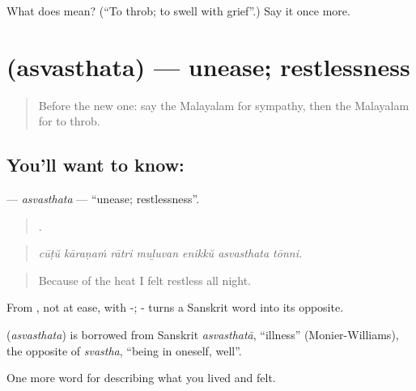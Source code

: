 \begin{tcolorbox}[breakable,colback=teal!4,colframe=teal!35!black,title={Before you move on}]
What does  mean? (\textquotedblleft{}To throb; to swell with grief\textquotedblright{}.) Say it once more.
\end{tcolorbox}
\section[\texorpdfstring{\ml{അസ്വസ്ഥത} (asvasthata)}{അസ്വസ്ഥത (asvasthata)}]{ (asvasthata) — unease; restlessness}

\label{lesson:ML-C520-asvasthata}



\begin{quote}
Before the new one: say the Malayalam for sympathy, then the Malayalam for to throb.
\end{quote}

\subsection*{You'll want to know: }
\textbf{} — \emph{asvasthata} — \textquotedblleft{}unease; restlessness\textquotedblright{}.

\begin{quote}
      .
\end{quote}

\begin{quote}
\emph{cūṭŭ kāraṇaṁ rātri muḻuvan enikkŭ asvasthata tōnni.}
\end{quote}

\begin{quote}
Because of the heat I felt restless all night.
\end{quote}

From , not at ease, with -; - turns a Sanskrit word into its opposite.

\begin{cousinweb}
\textbf{} (\emph{asvasthata}) is borrowed from Sanskrit \emph{asvasthatā}, \textquotedblleft{}illness\textquotedblright{} (Monier-Williams), the opposite of \emph{svastha}, \textquotedblleft{}being in oneself, well\textquotedblright{}.
\end{cousinweb}

\begin{grammarlens}[title={What you've built}]
One more word for describing what you lived and felt.
\end{grammarlens}

